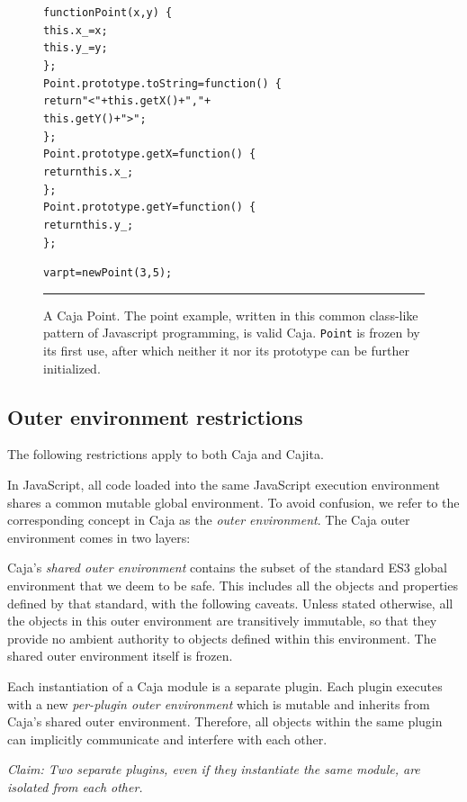 \documentclass[letterpaper,twocolumn,10pt]{article}
\newcommand{\code}[1]{{\tt {#1}}}              %
\begin{document}
\begin{figure}[t!]
\begin{alltt}
function Point(x, y)\ \{
  this.x\_ = x;
  this.y\_ = y;
\};
Point.prototype.toString = function()\ \{ 
  return "<" + this.getX() + "," + 
               this.getY() + ">"; 
\};
Point.prototype.getX = function()\ \{ 
  return this.x\_; 
\};
Point.prototype.getY = function()\ \{ 
  return this.y\_; 
\};

var pt = new Point(3, 5);
\end{alltt}

\caption[A Caja Point.]{A Caja Point. The point example, written
in this common class-like pattern of Javascript programming, is valid Caja.
\code{Point} is frozen by its first use, after which neither it nor its
prototype can be further initialized. \\ } \hrule
\label{fig:caja-point}
\end{figure}


\subsection{Outer environment restrictions}

The following restrictions apply to both Caja and Cajita.

In JavaScript, all code loaded into the same JavaScript execution environment 
shares a common mutable global environment. To avoid confusion, we refer to 
the corresponding concept in Caja as the \emph{outer environment}. The Caja 
outer environment comes in two layers:

Caja's \emph{shared outer environment} contains the subset of the standard 
ES3 global environment that we deem to be safe. This includes all the objects 
and properties defined by that standard, with the following caveats. Unless 
stated otherwise, all the objects in this outer environment are transitively 
immutable, so that they provide no ambient authority to objects defined 
within this environment. The shared outer environment itself is frozen.

Each instantiation of a Caja module is a separate plugin. Each plugin 
executes with a new \emph{per-plugin outer environment} which is mutable and 
inherits from Caja's shared outer environment. Therefore, all objects within 
the same plugin can implicitly communicate and interfere with each other. 

\emph{Claim: Two separate plugins, even if they instantiate the same module, 
are isolated from each other.}
\end{document}

